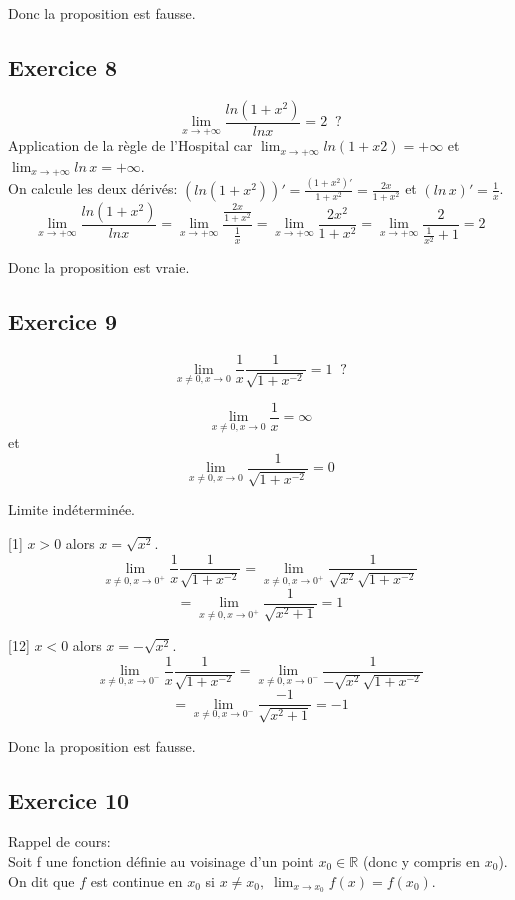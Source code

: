 \documentclass[]{book}
\theoremstyle{definition}
\newcommand{\bb}[1]{\mathbb{#1}}
\newcommand{\R}{\bb{R}}
\begin{document}
Donc la proposition est fausse.


\subsection*{Exercice 8}
$$\lim_{x \to +\infty} \frac{ln(1+x^2)}{ln x} = 2 \;\;?$$
Application de la r\`egle de l'Hospital car $\lim_{x \to +\infty} ln(1+x2) = +\infty$ et $\lim_{x \to +\infty} ln\, x = +\infty$.\\

On calcule les deux d\'eriv\'es: $(ln(1+x^2))' = \frac{(1+x^2)'}{1+x^2} = \frac{2x}{1+x^2}$ et $(ln\, x)' = \frac{1}{x}$.
$$ \lim_{x \to +\infty} \frac{ln(1+x^2)}{ln x} = \lim_{x \to +\infty} \frac{\frac{2x}{1+x^2}}{\frac{1}{x}} = \lim_{x \to +\infty} \frac{2x^2}{1+x^2} = \lim_{x \to +\infty} \frac{2}{\frac{1}{x^2}+1} = 2$$


Donc la proposition est vraie.

\subsection*{Exercice 9}
$$ \lim_{x \neq 0, x \to 0} \frac{1}{x} \frac{1}{\sqrt{1+x^{-2}}}= 1 \;\;?$$

$$\lim_{x \neq 0,x \to 0} \frac{1}{x} = \infty$$
et 
$$\lim_{x \neq 0,x \to 0} \frac{1}{\sqrt{1+x^{-2}}} = 0$$

Limite ind\'etermin\'ee.

[1] $x>0$ alors $x = \sqrt{x^2}$.
$$ \lim_{x \neq 0, x \to 0^{+}} \frac{1}{x} \frac{1}{\sqrt{1+x^{-2}}} = \lim_{x \neq 0, x \to 0^{+}} \frac{1}{\sqrt{x^2}\sqrt{1+x^{-2}}}$$
$$ = \lim_{x \neq 0, x \to 0^{+}} \frac{1}{\sqrt{x^2+1}} = 1$$



[12] $x<0$ alors $x = -\sqrt{x^2}$.
$$ \lim_{x \neq 0, x \to 0^{-}} \frac{1}{x} \frac{1}{\sqrt{1+x^{-2}}} = \lim_{x \neq 0, x \to 0^{-}} \frac{1}{-\sqrt{x^2}\sqrt{1+x^{-2}}}$$
$$ = \lim_{x \neq 0, x \to 0^{-}} \frac{-1}{\sqrt{x^2+1}} = -1$$



Donc la proposition est fausse.


\subsection*{Exercice 10}
Rappel de cours:\\
Soit f une fonction d\'efinie au voisinage d'un point $x_0 \in \R$ (donc y compris en
$x_0$). On dit que $f$ est continue en $x_0$ si $x \ne x_0,\;\lim_{x \to x_0} f(x) = f(x_0)$.
\end{document}
